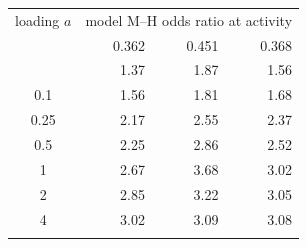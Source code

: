 \begin{tabular}{@{}crrr@{}}
\toprule
loading $a$ & \multicolumn{3}{c}{model M--H odds ratio at activity} \\
 & 0.362 & 0.451 & 0.368 \\
\colrule
0 & 1.37 & 1.87 & 1.56 \\
0.1 & 1.56 & 1.81 & 1.68 \\
0.25 & 2.17 & 2.55 & 2.37 \\
0.5 & 2.25 & 2.86 & 2.52 \\
1 & 2.67 & 3.68 & 3.02 \\
2 & 2.85 & 3.22 & 3.05 \\
4 & 3.02 & 3.09 & 3.08 \\
\botrule
\end{tabular}